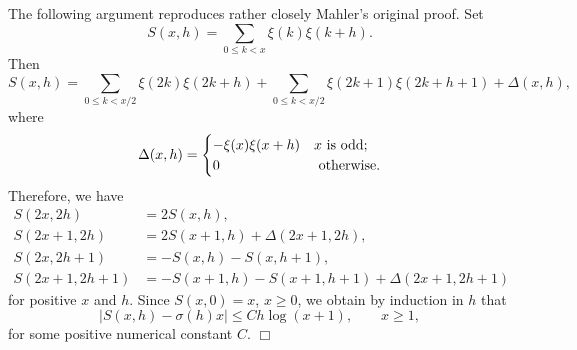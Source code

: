 \documentclass[11pt]{amsart}
\numberwithin{equation}{section}
\begin{document}
The following argument reproduces rather closely Mahler's original proof.
Set
$$
S(x,h)=\sum_{0\le k < x} \xi(k) \xi(k+h).
$$
Then
$$
S(x,h)=\sum_{0\le k < x/2} \xi(2k) \xi(2k+h)+\sum_{0\le k < x/2} \xi(2k+1) \xi(2k+h+1)+\Delta(x,h),
$$
where
$$
\Delta(x,h)=
\begin{cases}
-\xi(x)\xi(x+h) & x {\rm\ is\ odd}; \\
0 & {\rm\ otherwise}.
\end{cases}
$$
Therefore, we have
\begin{align*}
S(2x,2h)&=2S(x,h),\\
S(2x+1,2h)&=2S(x+1,h)+\Delta(2x+1,2h),\\
S(2x,2h+1)&=-S(x,h)-S(x,h+1),\\
S(2x+1,2h+1)&=-S(x+1,h)-S(x+1,h+1)+\Delta(2x+1,2h+1)
\end{align*}
for positive $x$ and $h$.
Since $S(x,0)=x$, $x\ge 0$, we obtain by induction in $h$ that
$$
\bigl|S(x,h)-\sigma(h)x\bigr|\le Ch\log(x+1),\qquad x\ge 1,
$$
for some positive numerical constant $C$. \hfill $\Box$
\end{document}
